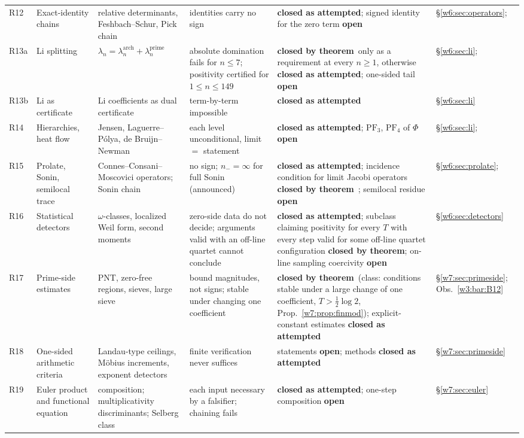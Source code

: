 \documentclass[11pt]{amsart}
\theoremstyle{definition}
\theoremstyle{remark}
\numberwithin{equation}{section}
\newcommand{\rtag}[1]{\textbf{\small\textsf{#1}}}
\newcommand{\closedT}{\rtag{closed by theorem}}
\newcommand{\closedA}{\rtag{closed as attempted}}
\newcommand{\openR}{\rtag{open}}
\begin{document}
{\begin{longtable}{>{\raggedright}p{0.9cm}>{\raggedright}p{2.6cm}>{\raggedright}p{3.2cm}>{\raggedright}p{3.6cm}>{\raggedright}p{2.4cm}>{\raggedright\arraybackslash}p{1.9cm}}
R12 & Exact-identity chains & relative determinants, Feshbach--Schur, Pick chain & identities carry no sign & \closedA; signed identity for the zero term \openR & \S\ref{w6:sec:operators}; \cite{P36}\\
R13a & Li splitting & $\lambda_n=\lambda_n^{\mathrm{arch}}+\lambda_n^{\mathrm{prime}}$ & absolute domination fails for $n\le7$; positivity certified for $1\le n\le149$ & \closedT\ only as a requirement at every $n\ge1$, otherwise \closedA; one-sided tail \openR & \S\ref{w6:sec:li}; \cite{P37,P38}\\
R13b & Li as certificate & Li coefficients as dual certificate & term-by-term impossible & \closedA & \S\ref{w6:sec:li}\\
R14 & Hierarchies, heat flow & Jensen, Laguerre--P\'olya, de Bruijn--Newman & each level unconditional, limit $=$ statement & \closedA; $\mathrm{PF}_3$, $\mathrm{PF}_4$ of $\Phi$ \openR & \S\ref{w6:sec:li}; \cite{P15}\\
R15 & Prolate, Sonin, semilocal trace & Connes--Consani--Moscovici operators; Sonin chain & no sign; $n_-=\infty$ for full Sonin (announced) & \closedA; incidence condition for limit Jacobi operators \closedT\ \cite[Prop.~3.3]{P23}; semilocal residue \openR & \S\ref{w6:sec:prolate}; \cite{P39,P40}\\
R16 & Statistical detectors & $\omega$-classes, localized Weil form, second moments & zero-side data do not decide; arguments valid with an off-line quartet cannot conclude & \closedA; subclass claiming positivity for every $T$ with every step valid for some off-line quartet configuration \closedT; on-line sampling coercivity \openR & \S\ref{w6:sec:detectors}\\
R17 & Prime-side estimates & PNT, zero-free regions, sieves, large sieve & bound magnitudes, not signs; stable under changing one coefficient & \closedT\ (class: conditions stable under a large change of one coefficient, $T>\frac12\log2$, Prop.~\ref{w7:prop:finmod}); explicit-constant estimates \closedA & \S\ref{w7:sec:primeside}; Obs.~\ref{w3:bar:B12}\\
R18 & One-sided arithmetic criteria & Landau-type ceilings, M\"obius increments, exponent detectors & finite verification never suffices & statements \openR; methods \closedA & \S\ref{w7:sec:primeside}\\
R19 & Euler product and functional equation & composition; multiplicativity discriminants; Selberg class & each input necessary by a falsifier; chaining fails & \closedA; one-step composition \openR & \S\ref{w7:sec:euler}\\

\end{longtable}}
\end{document}
